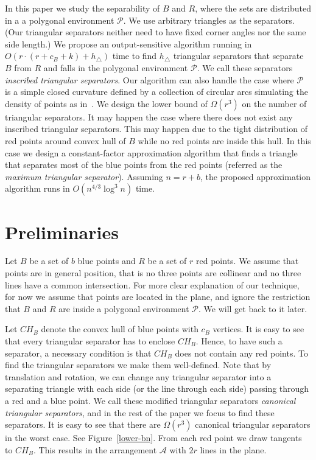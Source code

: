 \documentclass[a4paper,UKenglish]{lipics-v2018}
\theoremstyle{definition}
\begin{document}
In this paper we study the separability of $B$ and $R$, where the sets are distributed in a a polygonal environment $\mathcal P$. We use arbitrary triangles as the separators. (Our triangular separators neither need to have fixed corner angles nor the same side length.) We propose an output-sensitive algorithm running in $O(r \cdot (r+c_B+k)+h_\triangle)$  time to find $h_\triangle$ triangular separators that separate $B$ from $R$ and falls in the polygonal environment $\mathcal P$. We call these separators \emph{inscribed triangular separators}. Our algorithm can also handle the case where $\mathcal P$ is a simple closed curvature defined by a collection of circular arcs simulating the density of points as in~\cite{sep-rect,kreveld-tech}. We design the lower bound of $\Omega(r^3)$ on the number of triangular separators. It may happen the case where there does not exist any inscribed triangular separators. This may happen due to the tight distribution of red points around convex hull of $B$ while no red points are inside this hull. In this case we design a constant-factor approximation algorithm that finds a triangle that separates most of the blue points from the red points (referred as the \emph{maximum triangular separator}). Assuming $n=r+b$, the proposed approximation algorithm runs in $O(n^{4/3} \log^3 n)$ time.

\section{Preliminaries}
Let $B$ be a set of $b$ blue points and $R$ be a set of $r$ red points. We assume that points are in general position, that is no three points are collinear and no three lines have a common intersection. For more clear explanation of our technique, for now we assume that points are located in the plane, and ignore the restriction that $B$ and $R$ are inside a polygonal environment $\mathcal P$. We will get back to it later.

Let $CH_B$ denote the convex hull of blue points with $c_B$ vertices.
It is easy to see that every triangular separator has to enclose $CH_B$. Hence, to have such a separator, a necessary condition is that $CH_B$ does not contain any red points. To find the triangular separators we  make them well-defined. Note that by translation and rotation, we can change any triangular separator into a separating triangle with each side (or the line through each side) passing through a red and a blue point. We call these modified triangular separators \emph{canonical triangular separators}, and in the rest of the paper we focus to find these separators. It is easy to see that there are $\Omega(r^3)$ canonical triangular separators in the worst case. See Figure~\ref{lower-bn}. From each red point we draw tangents to $CH_B$. This results in the arrangement $\mathcal A$ with $2r$ lines in the plane.
\end{document}
